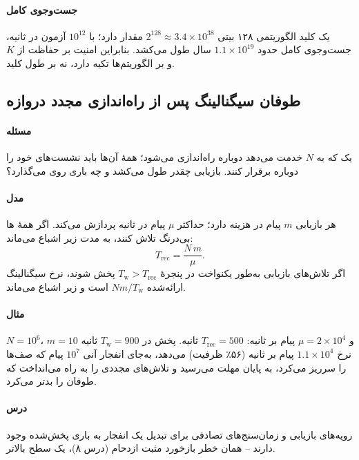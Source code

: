 \documentclass[11pt,a4paper]{article}
\begin{document}
\paragraph{جست‌وجوی کامل} یک کلید الگوریتمی ۱۲۸ بیتی $2^{128}\approx3.4\times10^{38}$ مقدار دارد؛ با $10^{12}$ آزمون در
ثانیه، جست‌وجوی کامل حدود $1.1\times10^{19}$ سال طول می‌کشد. بنابراین امنیت بر حفاظت از $K$ و بر الگوریتم‌ها تکیه
دارد، نه بر طول کلید.

\subsection{طوفان سیگنالینگ پس از راه‌اندازی مجدد دروازه}\label{sec:storm}
\paragraph{مسئله} یک  که به $N$  خدمت می‌دهد دوباره راه‌اندازی می‌شود؛ همهٔ آن‌ها باید نشست‌های خود را
دوباره برقرار کنند. بازیابی چقدر طول می‌کشد و چه باری روی  می‌گذارد؟
\paragraph{مدل} هر بازیابی $m$ پیام در  هزینه دارد؛  حداکثر $\mu$ پیام در ثانیه پردازش می‌کند. اگر همهٔ
ها بی‌درنگ تلاش کنند،  به مدت زیر اشباع می‌ماند:
\begin{equation}\label{eq:storm}
  T_{\mathrm{rec}} = \frac{N\,m}{\mu}.
\end{equation}
اگر تلاش‌های بازیابی به‌طور یکنواخت در پنجرهٔ $T_\mathrm{w} > T_{\mathrm{rec}}$ پخش شوند، نرخ سیگنالینگ ارائه‌شده
$N m/T_\mathrm{w}$ است و  زیر اشباع می‌ماند.
\paragraph{مثال} $N = 10^6$، $m = 10$ و $\mu = 2\times10^4$ پیام بر ثانیه: $T_{\mathrm{rec}} = 500$ ثانیه. پخش در
$T_\mathrm{w} = 900$ ثانیه نرخ $1.1\times10^4$ پیام بر ثانیه (۵۶٪ ظرفیت) می‌دهد، به‌جای انفجار آنی $10^7$ پیام که
صف‌ها را سرریز می‌کرد، به پایان مهلت می‌رسید و تلاش‌های مجددی را به راه می‌انداخت که طوفان را بدتر می‌کرد.
\paragraph{درس} رویه‌های بازیابی و زمان‌سنج‌های تصادفی برای تبدیل یک انفجار به باری پخش‌شده وجود دارند -- همان خطر
بازخورد مثبت ازدحام  (درس ۸)، یک سطح بالاتر.
\end{document}
